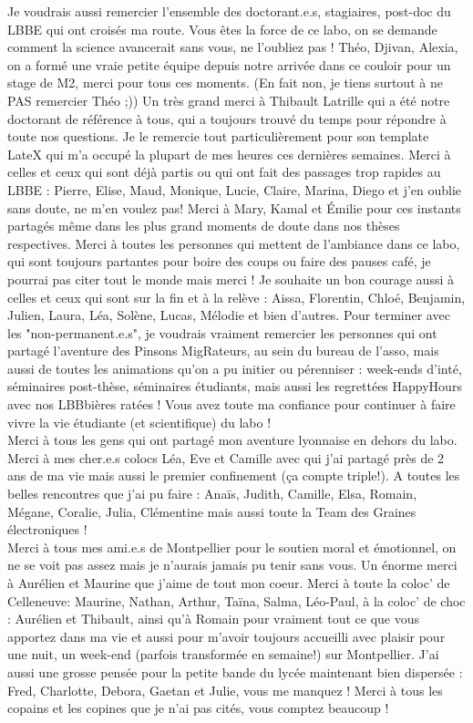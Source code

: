 Je voudrais aussi remercier l'ensemble des doctorant.e.s, stagiaires, post-doc du LBBE qui ont croisés ma route. Vous êtes la force de ce labo, on se demande comment la science avancerait sans vous, ne l'oubliez pas ! Théo, Djivan, Alexia, on a formé une vraie petite équipe depuis notre arrivée dans ce couloir pour un stage de M2, merci pour tous ces moments. (En fait non, je tiens surtout à ne PAS remercier Théo ;)) Un très grand merci à Thibault Latrille qui a été notre doctorant de référence à tous, qui a toujours trouvé du temps pour répondre à toute nos questions. Je le remercie tout particulièrement pour son template LateX qui m'a occupé la plupart de mes heures ces dernières semaines. Merci à celles et ceux qui sont déjà partis ou qui ont fait des passages trop rapides au LBBE : Pierre, Elise, Maud, Monique, Lucie, Claire, Marina, Diego et j'en oublie sans doute, ne m'en voulez pas! Merci à Mary, Kamal et \'Emilie pour ces instants partagés même dans les plus grand moments de doute dans nos thèses respectives. Merci à toutes les personnes qui mettent de l'ambiance dans ce labo, qui sont toujours partantes pour boire des coups ou faire des pauses café, je pourrai pas citer tout le monde mais merci ! Je souhaite un bon courage aussi à celles et ceux qui sont sur la fin et à la relève : Aissa, Florentin, Chloé, Benjamin, Julien, Laura, Léa, Solène, Lucas, Mélodie et bien d'autres. Pour terminer avec les "non-permanent.e.s", je voudrais vraiment remercier les personnes qui ont partagé l'aventure des Pinsons MigRateurs, au sein du bureau de l'asso, mais aussi de toutes les animations qu'on a pu initier ou pérenniser : week-ends d'inté, séminaires post-thèse, séminaires étudiants, mais aussi les regrettées HappyHours avec nos LBBbières ratées ! Vous avez toute ma confiance pour continuer à faire vivre la vie étudiante (et scientifique) du labo !\\

Merci à tous les gens qui ont partagé mon aventure lyonnaise en dehors du labo. Merci à mes cher.e.s colocs Léa, Eve et Camille avec qui j'ai partagé près de 2 ans de ma vie mais aussi le premier confinement (ça compte triple!). A toutes les belles rencontres que j'ai pu faire : Anaïs, Judith, Camille, Elsa, Romain, Mégane, Coralie, Julia, Clémentine mais aussi toute la Team des Graines électroniques !\\

Merci à tous mes ami.e.s de Montpellier pour le soutien moral et émotionnel, on ne se voit pas assez mais je n'aurais jamais pu tenir sans vous. Un énorme merci à Aurélien et Maurine que j'aime de tout mon coeur. Merci à toute la coloc' de Celleneuve: Maurine, Nathan, Arthur, Taïna, Salma, Léo-Paul, à la coloc' de choc : Aurélien et Thibault, ainsi qu'à Romain pour vraiment tout ce que vous apportez dans ma vie et aussi pour m'avoir toujours accueilli avec plaisir pour une nuit, un week-end (parfois transformée en semaine!) sur Montpellier. J'ai aussi une grosse pensée pour la petite bande du lycée maintenant bien dispersée : Fred, Charlotte, Debora, Gaetan et Julie, vous me manquez ! Merci à tous les copains et les copines que je n'ai pas cités, vous comptez beaucoup !\\

